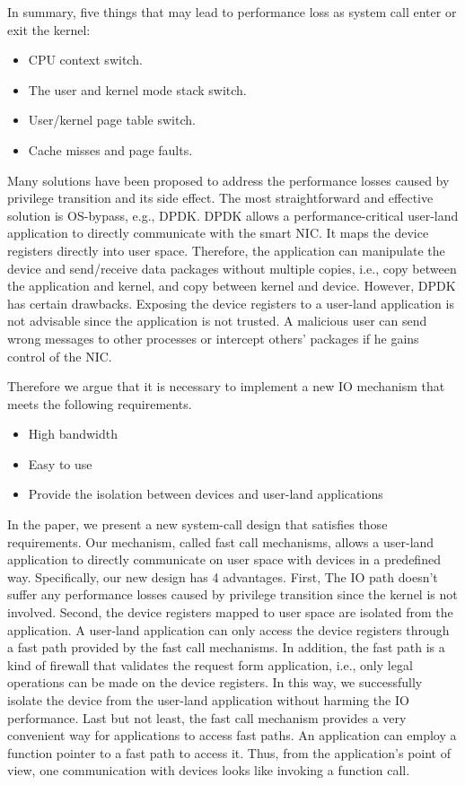 In summary, five things that may lead to performance loss as system call 
enter or exit the kernel:
\begin{itemize}
  \item CPU context switch.
  \item The user and kernel mode stack switch.
  \item User/kernel page table switch.
  \item Cache misses and page faults.
\end{itemize}


Many solutions have been proposed to address the performance losses caused 
by privilege transition and its side effect. The most straightforward and 
effective solution is OS-bypass, e.g., DPDK. DPDK allows a performance-critical 
user-land application to directly communicate with the smart NIC. It maps the 
device registers directly into user space. Therefore, the application can manipulate
 the device and send/receive data packages without multiple copies, i.e., copy between the application and kernel, 
 and copy between kernel and device. However, DPDK has certain drawbacks. Exposing the device registers to a 
 user-land application is not advisable since the application is not trusted. A malicious user can send wrong 
 messages to other processes or intercept others' packages if he gains control of the NIC.


Therefore we argue that it is necessary to implement a new IO mechanism that meets the following requirements.

\begin{itemize}
  \item  High bandwidth
  \item  Easy to use
  \item  Provide the isolation between devices and user-land applications
\end{itemize}



 
In the paper, we present a new system-call design that satisfies those requirements. 
Our mechanism, called fast call mechanisms,  allows a user-land application to directly 
communicate on user space with devices in a predefined way. Specifically, our new design has 
4 advantages. First, The IO path doesn't suffer any performance losses caused by privilege 
transition since the kernel is not involved.  Second, the device registers mapped to user space 
are isolated from the application. A user-land application can only access the device registers 
through a fast path provided by the fast call mechanisms. In addition, the fast path is a kind
 of firewall that validates the request form application, i.e., only legal operations can be 
 made on the device registers. In this way, we successfully isolate the device from the user-land 
 application without harming the IO performance. Last but not least,  the fast call mechanism provides 
 a very convenient way for applications to access fast paths. An application can employ a function 
 pointer to a fast path to access it.  Thus, from the application's point of view,  one communication 
 with devices looks like invoking a function call.

